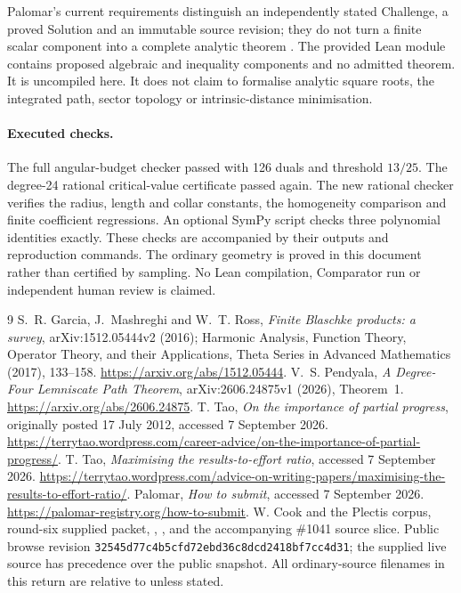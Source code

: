 \documentclass[11pt,a4paper]{article}
\theoremstyle{remark}\newtheorem{remark}[theorem]{Remark}
\begin{document}
Palomar's current requirements distinguish an independently stated Challenge,
a proved Solution and an immutable source revision; they do not turn a
finite scalar component into a complete analytic theorem \cite{palomar}.
The provided Lean module contains proposed algebraic and inequality
components and no admitted theorem. It is uncompiled here. It does not claim
to formalise analytic square roots, the integrated path, sector topology or
intrinsic-distance minimisation.

\paragraph{Executed checks.}
The full angular-budget checker passed with 126 duals and threshold $13/25$.
The degree-24 rational critical-value certificate passed again.
The new rational checker verifies the radius, length and collar constants,
the homogeneity comparison and finite coefficient regressions.
An optional SymPy script checks three polynomial identities exactly.
These checks are accompanied by their outputs and reproduction commands.
The ordinary geometry is proved in this document rather than certified by
sampling. No Lean compilation, Comparator run or independent human review is
claimed.

\begin{thebibliography}{9}
 S.~R. Garcia, J.~Mashreghi and W.~T. Ross,
\emph{Finite Blaschke products: a survey}, arXiv:1512.05444v2 (2016);
Harmonic Analysis, Function Theory, Operator Theory, and their Applications,
Theta Series in Advanced Mathematics (2017), 133--158.
\url{https://arxiv.org/abs/1512.05444}.
 V.~S. Pendyala, \emph{A Degree-Four Lemniscate Path Theorem},
arXiv:2606.24875v1 (2026), Theorem~1.
\url{https://arxiv.org/abs/2606.24875}.
 T. Tao, \emph{On the importance of partial progress},
originally posted 17 July 2012, accessed 7 September 2026.
\url{https://terrytao.wordpress.com/career-advice/on-the-importance-of-partial-progress/}.
 T. Tao, \emph{Maximising the results-to-effort ratio},
accessed 7 September 2026.
\url{https://terrytao.wordpress.com/advice-on-writing-papers/maximising-the-results-to-effort-ratio/}.
 Palomar, \emph{How to submit}, accessed 7 September 2026.
\url{https://palomar-registry.org/how-to-submit}.
 W. Cook and the Plectis corpus, round-six supplied packet,
, , and the accompanying
\#1041 source slice. Public browse revision
\texttt{32545d77c4b5cfd72ebd36c8dcd2418bf7cc4d31}; the supplied live source
has precedence over the public snapshot. All ordinary-source filenames in
this return are relative to  unless stated.
\end{thebibliography}
\end{document}
